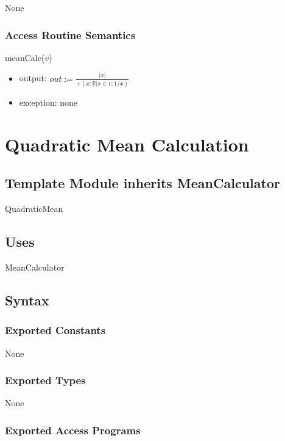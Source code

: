 \documentclass[12pt,fleqn]{examtst}
\begin{document}
None

\subsubsection* {Access Routine Semantics}

meanCalc($v$)
\begin{itemize}
\item output: $\mathit{out} := \frac{|x|}{+(x: \mathbb{R} | x \in v : 1/x)}$
\item exception: none
\end{itemize}


\newpage

\section* {Quadratic Mean Calculation}

\subsection*{Template Module inherits MeanCalculator}

QuadraticMean

\subsection* {Uses}

MeanCalculator

\subsection* {Syntax}

\subsubsection* {Exported Constants}

None

\subsubsection* {Exported Types}

None 

\subsubsection* {Exported Access Programs}
\end{document}
